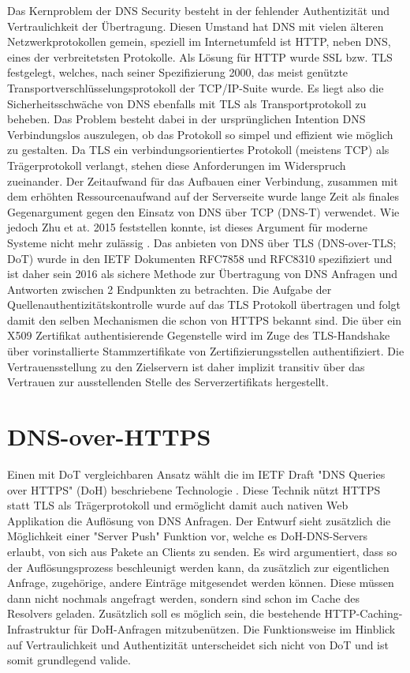 Das Kernproblem der DNS Security besteht in der fehlender Authentizität und Vertraulichkeit der Übertragung. Diesen Umstand hat DNS mit vielen älteren Netzwerkprotokollen gemein, speziell im Internetumfeld ist HTTP, neben DNS, eines der verbreitetsten Protokolle. Als Lösung für HTTP wurde SSL bzw. TLS festgelegt, welches, nach seiner Spezifizierung 2000, das meist genützte Transportverschlüsselungsprotokoll der TCP/IP-Suite wurde. Es liegt also die Sicherheitsschwäche von DNS ebenfalls mit TLS als Transportprotokoll zu beheben. Das Problem besteht dabei in der ursprünglichen Intention DNS Verbindungslos auszulegen, ob das Protokoll so simpel und effizient wie möglich zu gestalten. Da TLS ein verbindungsorientiertes Protokoll (meistens TCP) als Trägerprotokoll verlangt, stehen diese Anforderungen im Widerspruch zueinander. Der Zeitaufwand für das Aufbauen einer Verbindung, zusammen mit dem erhöhten Ressourcenaufwand auf der Serverseite wurde lange Zeit als finales Gegenargument gegen den Einsatz von DNS über TCP (DNS-T) verwendet. Wie jedoch Zhu et at. 2015 feststellen konnte, ist dieses Argument für moderne Systeme nicht mehr zulässig \cite{Zhu2015}. Das anbieten von DNS über TLS (DNS-over-TLS; DoT) wurde in den IETF Dokumenten RFC7858\cite{Hu2016} und RFC8310\cite{Dickinson2018} spezifiziert und ist daher sein 2016 als sichere Methode zur Übertragung von DNS Anfragen und Antworten zwischen 2 Endpunkten zu betrachten. Die Aufgabe der Quellenauthentizitätskontrolle wurde auf das TLS Protokoll übertragen und folgt damit den selben Mechanismen die schon von HTTPS bekannt sind. Die über ein X509 Zertifikat authentisierende Gegenstelle wird im Zuge des TLS-Handshake über vorinstallierte Stammzertifikate von Zertifizierungsstellen authentifiziert. Die Vertrauensstellung zu den Zielservern ist daher implizit transitiv über das Vertrauen zur ausstellenden Stelle des Serverzertifikats hergestellt.        

\section{DNS-over-HTTPS}

Einen mit DoT vergleichbaren Ansatz wählt die im IETF Draft "DNS Queries over HTTPS" (DoH) beschriebene Technologie \cite{Mcmanus2018}. Diese Technik nützt HTTPS statt TLS als Trägerprotokoll und ermöglicht damit auch nativen Web Applikation die Auflösung von DNS Anfragen. Der Entwurf sieht zusätzlich die Möglichkeit einer "Server Push" Funktion vor, welche es DoH-DNS-Servers erlaubt, von sich aus Pakete an Clients zu senden. Es wird argumentiert, dass so der Auflösungsprozess beschleunigt werden kann, da zusätzlich zur eigentlichen Anfrage, zugehörige, andere Einträge mitgesendet werden können. Diese müssen dann nicht nochmals angefragt werden, sondern sind schon im Cache des Resolvers geladen. Zusätzlich soll es möglich sein, die bestehende HTTP-Caching-Infrastruktur für DoH-Anfragen mitzubenützen. Die Funktionsweise im Hinblick auf Vertraulichkeit und Authentizität unterscheidet sich nicht von DoT und ist somit grundlegend valide.


